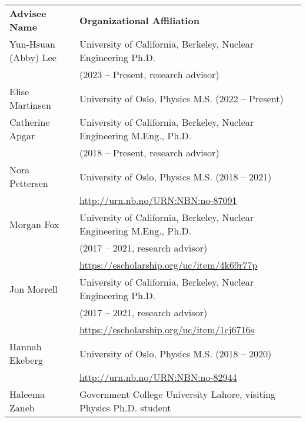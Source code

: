 \begin{longtable}{ @{} l @{\hspace{6ex}} l }
\bf{Advisee Name}   &  \bf{Organizational Affiliation}\\

Yun-Hsuan (Abby) Lee & University of California, Berkeley, Nuclear Engineering Ph.D. \\ & (2023 -- Present, research advisor)\\
Elise Martinsen & University of Oslo, Physics M.S. (2022 -- Present)\\
Catherine  Apgar & University of California, Berkeley, Nuclear Engineering M.Eng., Ph.D. \\ & (2018 -- Present, research advisor)\\
Nora Pettersen & University of Oslo, Physics M.S. (2018 -- 2021)\\
               & \url{http://urn.nb.no/URN:NBN:no-87091}\vspace{0.5mm}\\
Morgan  Fox & University of California, Berkeley, Nuclear Engineering M.Eng., Ph.D. \\ & (2017 -- 2021, research advisor)\\
                & \url{https://escholarship.org/uc/item/4k69r77p}\vspace{0.5mm}\\               
Jon  Morrell & University of California, Berkeley, Nuclear Engineering Ph.D. \\ & (2017 -- 2021, research advisor)\\
                & \url{https://escholarship.org/uc/item/1cj6716s}\vspace{0.5mm}\\
Hannah Ekeberg & University of Oslo, Physics M.S. (2018 -- 2020)\\
               & \url{http://urn.nb.no/URN:NBN:no-82944}\vspace{0.5mm}\\
Haleema Zaneb  & Government College University Lahore,
visiting Physics Ph.D. student\\ 

\end{longtable}
